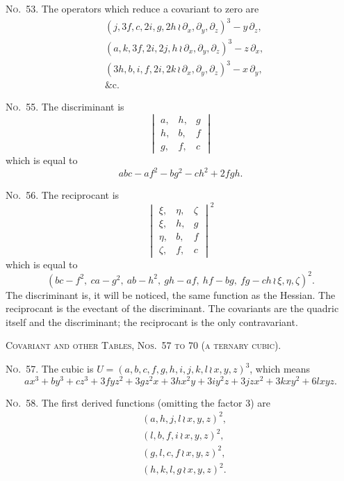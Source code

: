 \documentclass[11pt,a4paper]{book}
\begin{document}
\begin{center}
\noindent\textsc{No.~53.} The operators which reduce a covariant to zero are
\begin{align*}
&(j, 3f, c, 2i, g, 2h \, \wr\, \partial_x, \partial_y, \partial_z)^3 - y\,\partial_z,\\
&(a, k, 3f, 2i, 2j, h \, \wr\, \partial_x, \partial_y, \partial_z)^3 - z\,\partial_x,\\
&(3h, b, i, f, 2i, 2k \, \wr\, \partial_x, \partial_y, \partial_z)^3 - x\,\partial_y,\\
&\text{\&c.}
\end{align*}

\noindent\textsc{No.~55.} The discriminant is
\[
\begin{vmatrix}
a, & h, & g \\
h, & b, & f \\
g, & f, & c
\end{vmatrix}
\]
which is equal to
\[abc - af^2 - bg^2 - ch^2 + 2fgh.\]

\noindent\textsc{No.~56.} The reciprocant is
\[
\begin{vmatrix}
\xi, & \eta, & \zeta \\
\xi, & h, & g \\
\eta, & b, & f \\
\zeta, & f, & c
\end{vmatrix}^2
\]
which is equal to
\[(bc-f^2,\ ca-g^2,\ ab-h^2,\ gh-af,\ hf-bg,\ fg-ch \, \wr\, \xi, \eta, \zeta)^2.\]
The discriminant is, it will be noticed, the same function as the Hessian.
The reciprocant is the evectant of the discriminant.
The covariants are the quadric itself and the discriminant; the reciprocant is the only contravariant.

\clearpage
\noindent\textsc{Covariant and other Tables, Nos.~57 to 70 (a ternary cubic).}

\noindent\textsc{No.~57.} The cubic is $U = (a, b, c, f, g, h, i, j, k, l \, \wr\, x, y, z)^3$,
which means
\[ax^3 + by^3 + cz^3 + 3fyz^2 + 3gz^2x + 3hx^2y + 3iy^2z + 3jzx^2 + 3kxy^2 + 6lxyz.\]

\noindent\textsc{No.~58.} The first derived functions (omitting the factor 3) are
\begin{align*}
&(a, h, j, l \, \wr\, x, y, z)^2,\\
&(l, b, f, i \, \wr\, x, y, z)^2,\\
&(g, l, c, f \, \wr\, x, y, z)^2,\\
&(h, k, l, g \, \wr\, x, y, z)^2.
\end{align*}


\end{center}
\end{document}
